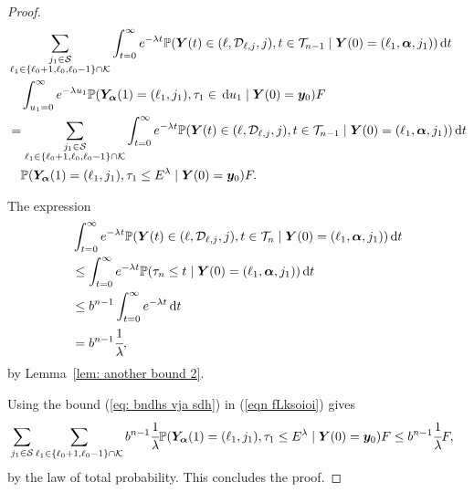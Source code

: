 \begin{proof}
	\begin{align}
		&\sum_{\substack{j_1\in\mathcal S\\\ell_1\in\{\ell_0+1,\ell_0,\ell_0-1\}\cap\mathcal K}}\int_{t=0}^\infty e^{-\lambda t} \mathbb P({\boldsymbol Y}(t) \in (\ell,\mathcal D_{\ell,j},j), t\in\mathcal T_{n-1} \nonumber
		\mid \boldsymbol Y(0)=(\ell_1,\boldsymbol \alpha, j_1)) \, \mathrm{d} t 
		\\&\quad{}\int_{u_1=0}^\infty e^{-\lambda u_1}\mathbb P(\bm{Y}_{\bm{\alpha}}(1)=(\ell_1,j_1), \tau_1\in \, \mathrm{d} u_1
		\mid \boldsymbol Y(0)=\boldsymbol y_0)F  \nonumber 
		\\&=\sum_{\substack{j_1\in\mathcal S\\\ell_1\in\{\ell_0+1,\ell_0,\ell_0-1\}\cap\mathcal K}}\int_{t=0}^\infty e^{-\lambda t} \mathbb P({\boldsymbol Y}(t) \in (\ell,\mathcal D_{\ell,j},j), t\in\mathcal T_{n-1} \nonumber
		\mid \boldsymbol Y(0)=(\ell_1,\boldsymbol\alpha,j_1)) \, \mathrm{d} t 
		\\&\quad{}\mathbb P(\bm{Y}_{\bm{\alpha}}(1)=(\ell_1,j_1), \tau_1\leq E^\lambda
		\mid \boldsymbol Y(0)=\boldsymbol y_0)F. \label{eqn fLksoioi}
	\end{align}
	
	The expression 
	\begin{align}
		&\int_{t=0}^\infty e^{-\lambda t} \mathbb P( {\boldsymbol Y}(t) \in (\ell,\mathcal D_{\ell,j},j), t\in\mathcal T_n\nonumber
		\mid \boldsymbol Y(0)=(\ell_1,\boldsymbol \alpha,j_1)) \, \mathrm{d} t
		\\&\leq \int_{t=0}^\infty e^{-\lambda t} \mathbb P(\tau_{n}\leq t \nonumber
		\mid \boldsymbol Y(0)=(\ell_1,\boldsymbol\alpha,j_1)) \, \mathrm{d} t
		\\&\leq b^{n-1}\int_{t=0}^\infty e^{-\lambda t} \, \mathrm{d} t \nonumber 
		\\&=b^{n-1}\cfrac{1}{\lambda}, \label{eq: bndhs vja sdh}
	\end{align}
	by Lemma~\ref{lem: another bound 2}.
	
	Using the bound (\ref{eq: bndhs vja sdh}) in (\ref{eqn fLksoioi}) gives 
	\begin{align}
		&\sum_{j_1\in\mathcal S}\sum_{\ell_1\in\{\ell_0+1,\ell_0-1\}\cap\mathcal K} b^{n-1}\cfrac{1}{\lambda} 
		\mathbb P(\bm{Y}_{\bm{\alpha}}(1)=(\ell_1,j_1), \tau_1\leq E^\lambda
		\mid \boldsymbol Y(0)=\boldsymbol y_0)F\leq b^{n-1}\cfrac{1}{\lambda}F, \label{eqn fLksoioi2}
	\end{align}
	by the law of total probability. This concludes the proof. 
\end{proof}

